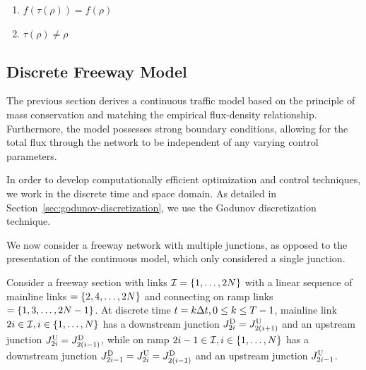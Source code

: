 \begin{enumerate}
	\item $f(\tau(\rho)) = f(\rho)$
	\item $\tau(\rho) \neq \rho$
\end{enumerate}

\subsection{Discrete Freeway Model}
\label{sub:discrete-freeway-model}

The previous section derives a continuous traffic model based on the principle of mass conservation and matching the empirical flux-density relationship. Furthermore, the model possesses strong boundary conditions, allowing for the total flux through the network to be independent of any varying control parameters.

In order to develop computationally efficient optimization and control techniques, we work in the discrete time and space domain. As detailed in Section~\ref{sec:godunov-discretization}, we use the Godunov discretization technique.

We now consider a freeway network with multiple junctions, as opposed to the presentation of the continuous model, which only considered a single junction.

Consider a freeway section with links $\links=\intrange 1{2\nlinks}$
with a linear sequence of mainline links $=\intrange{2,4}{2\nlinks}$
and connecting on ramp links $=\intrange{1,3}{2\nlinks-1}$. At discrete
time $t=k\Delta t,0\le k\le T-1$, mainline link $2\link\in\links,i\in\intrange 1{\nlinks}$
has a downstream junction $\jdown{2\link}=\jup{2\left(\link+1\right)}$
and an upstream junction $\jup{2\link}=\jdown{2\left(\link-1\right)}$,
while on ramp $2\link-1\in\links,i\in\intrange 1{\nlinks}$ has a downstream
junction $\jdown{2\link-1}=\jup{2\link}=\jdown{2\left(\link-1\right)}$
and an upstream junction $J_{2i-1}^{\text{U}}$.

